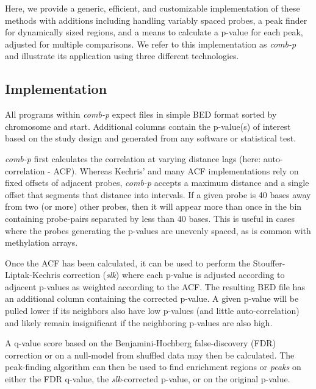 \documentclass{bioinfo}
\begin{document}
Here, we provide a generic, efficient, and customizable implementation
of these methods with additions including handling variably spaced
probes, a peak finder for dynamically sized regions, and a means to
calculate a p-value for each peak, adjusted for multiple
comparisons. We refer to this implementation as \textit{comb-p} and
illustrate its application using three different technologies.

\begin{methods}

\section{Implementation}

All programs within \textit{comb-p} expect files in simple BED format
\citep{Kent2002} sorted by chromosome and start.
Additional columns contain the p-value(s) of interest based on the
study design and generated from any software or statistical test.


\textit{comb-p} first
calculates the correlation at varying distance lags
(here: auto-correlation - ACF).
 Whereas Kechris'
\citep{Kechris2010} and many ACF implementations rely on fixed offsets
of adjacent probes, \textit{comb-p} accepts a maximum
distance and a single offset that segments that distance into intervals.
If a given probe is 40 bases away from two (or more) other probes, then it will
appear more than once in the bin containing probe-pairs separated by less
than 40 bases. This is useful in cases where the probes generating the p-values
are unevenly spaced, as is common with methylation arrays.

Once the ACF has been calculated, it can be used to perform the
Stouffer-Liptak-Kechris correction (\textit{slk}) where each p-value is
adjusted according to adjacent p-values as weighted
according to the ACF. The resulting BED file
has an additional column containing the corrected p-value.
A given p-value will be pulled lower if its neighbors also have low
p-values (and little auto-correlation) and likely remain insignificant if the
neighboring p-values are also high.

A q-value score based on the Benjamini-Hochberg false-discovery (FDR)
correction or on a null-model from shuffled data may then be calculated.
The peak-finding algorithm can then be
used to find enrichment regions or \textit{peaks} on either the FDR
q-value, the \textit{slk}-corrected p-value, or on the original
p-value.


\end{methods}
\end{document}
